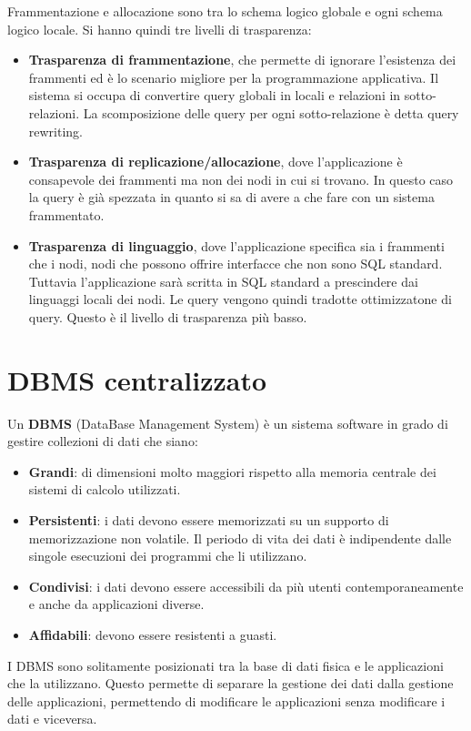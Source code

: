 Frammentazione e allocazione sono tra lo schema logico globale e ogni schema
logico locale. Si hanno quindi tre livelli di trasparenza:
\begin{itemize}
      \item \textbf{Trasparenza di frammentazione}, che permette di ignorare
            l'esistenza dei frammenti ed è lo scenario migliore per la
            programmazione applicativa. Il sistema si occupa di convertire query
            globali in locali e relazioni in sotto-relazioni. La scomposizione
            delle query per ogni sotto-relazione è detta query rewriting.
      \item \textbf{Trasparenza di replicazione/allocazione}, dove l'applicazione
            è consapevole dei frammenti ma non dei nodi in cui si trovano. In questo
            caso la query è già spezzata in quanto si sa di avere a che fare con un
            sistema frammentato.
      \item \textbf{Trasparenza di linguaggio}, dove l'applicazione specifica
            sia i frammenti che i nodi, nodi che possono offrire interfacce che
            non sono SQL standard. Tuttavia l'applicazione sarà scritta in SQL
            standard a prescindere dai linguaggi locali dei nodi. Le query
            vengono quindi tradotte ottimizzatone di query. Questo è il livello
            di trasparenza più basso.
\end{itemize}
\section{DBMS centralizzato}
\begin{definizione}
      Un \textbf{DBMS} (DataBase Management System) è un sistema software in grado
      di gestire collezioni di dati che siano:
      \begin{itemize}
            \item \textbf{Grandi}: di dimensioni molto maggiori rispetto alla memoria
                  centrale dei sistemi di calcolo utilizzati.
            \item \textbf{Persistenti}: i dati devono essere memorizzati su un
                  supporto di memorizzazione non volatile. Il periodo di vita dei
                  dati è indipendente dalle singole esecuzioni dei programmi che li
                  utilizzano.
            \item \textbf{Condivisi}: i dati devono essere accessibili da più utenti
                  contemporaneamente e anche da applicazioni diverse.
            \item \textbf{Affidabili}: devono essere resistenti a guasti.
      \end{itemize}
\end{definizione}
I DBMS sono solitamente posizionati tra la base di dati fisica e le applicazioni
che la utilizzano. Questo permette di separare la gestione dei dati dalla
gestione delle applicazioni, permettendo di modificare le applicazioni senza
modificare i dati e viceversa.

